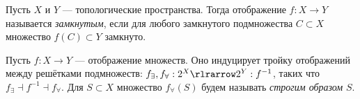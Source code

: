 \documentclass[
	extrafontsizes,
	11pt,
	hyphens,
]{memoir}
\begin{document}



\begin{definition}
Пусть \(X\) и \(Y\) --- топологические пространства.
Тогда отображение \(f : X \to Y\) называется \emph{замкнутым}, если для любого замкнутого подмножества \(C \subset X\) множество \(f(C) \subset Y\) замкнуто.
\end{definition}

\begin{observation}
Пусть \(f : X \to Y\) --- отображение множеств. Оно индуцирует тройку отображений между решётками подмножеств:
\(f_\exists, f_\forall : 2^X \rlrarrow 2^Y : f^{-1}\),
таких что \(f_\exists \dashv f^{-1} \dashv f_\forall\).
Для \(S \subset X\) множество \(f_\forall(S)\) будем называть \emph{строгим образом} \(S\).
\end{observation}
\end{document}
